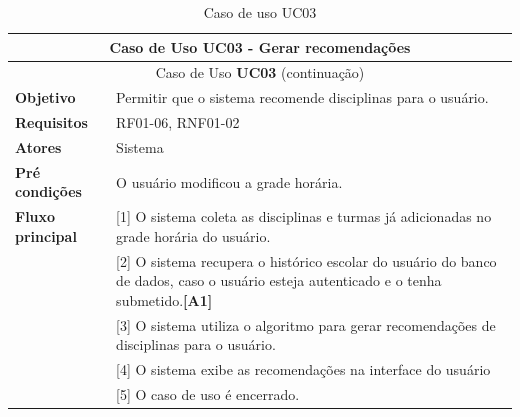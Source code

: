 \begin{longtable}{ | m{} | m{} | }
    \hline\hline
    \multicolumn{2}{|c|}{Caso de Uso \textbf{UC03} - Gerar recomendações}\tabularnewline\hline\hline\endfirsthead
    \hline\hline
    \multicolumn{2}{|c|}{Caso de Uso \textbf{UC03} (continuação)}\tabularnewline\hline\hline\endhead
    \hline\endfoot
    \hline\caption{Caso de uso UC03}\endlastfoot

    \textbf{Objetivo} & Permitir que o sistema recomende disciplinas para o usuário.\tabularnewline\hline 
    \textbf{Requisitos} & RF01-06, RNF01-02\tabularnewline\hline
    \textbf{Atores} & Sistema\tabularnewline\hline
    \textbf{Pré condições} & O usuário modificou a grade horária.\tabularnewline\hline

    \multirow{1}{*}{\textbf{Fluxo principal}} & [1] O sistema coleta as disciplinas e turmas já adicionadas no grade horária do usuário.\tabularnewline\cline{2-2}
    & [2] O sistema recupera o histórico escolar do usuário do banco de dados, caso o usuário esteja autenticado e o tenha submetido.\textbf{[A1]}\tabularnewline\cline{2-2}
    & [3] O sistema utiliza o algoritmo para gerar recomendações de disciplinas para o usuário.\tabularnewline\cline{2-2}
    & [4] O sistema exibe as recomendações na interface do usuário\tabularnewline\cline{2-2}
    & [5] O caso de uso é encerrado.
    \label{tab:uc03}
\end{longtable}


